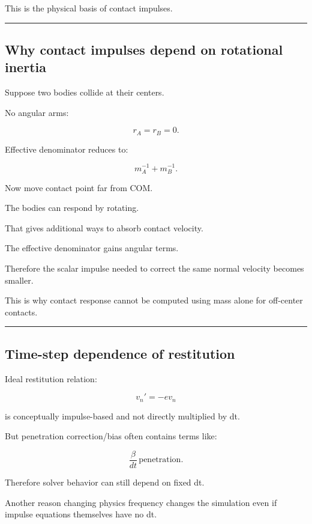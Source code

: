 This is the physical basis of contact impulses.

\begin{center}\rule{0.5\linewidth}{0.5pt}\end{center}

\subsection{Why contact impulses depend on rotational inertia}\label{06-engine-ii-ch038-why-contact-impulses-depend-on-rotational-inertia}

Suppose two bodies collide at their centers.

No angular arms:

\[
r_A=r_B=0.
\]

Effective denominator reduces to:

\[
m_A^{-1}+m_B^{-1}.
\]

Now move contact point far from COM.

The bodies can respond by rotating.

That gives additional ways to absorb contact velocity.

The effective denominator gains angular terms.

Therefore the scalar impulse needed to correct the same normal velocity becomes smaller.

This is why contact response cannot be computed using mass alone for off-center contacts.

\begin{center}\rule{0.5\linewidth}{0.5pt}\end{center}

\subsection{Time-step dependence of restitution}\label{06-engine-ii-ch038-time-step-dependence-of-restitution}

Ideal restitution relation:

\[
v_n'
=
-e v_n
\]

is conceptually impulse-based and not directly multiplied by dt.

But penetration correction/bias often contains terms like:

\[
\frac{\beta}{dt}\,\text{penetration}.
\]

Therefore solver behavior can still depend on fixed dt.

Another reason changing physics frequency changes the simulation even if impulse equations themselves have no dt.

